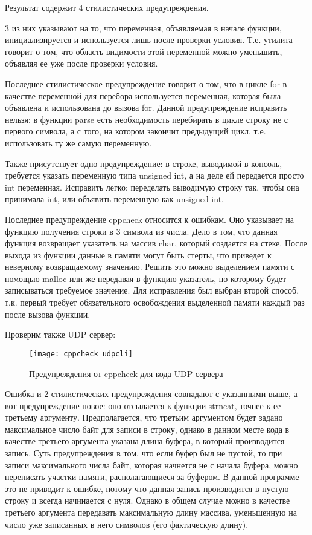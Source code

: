 Результат содержит 4 стилистических предупреждения.

3 из них указывают на то, что переменная, объявляемая в начале функции, инициализируется и используется лишь после проверки условия. Т.е. утилита говорит о том, что область видимости этой переменной можно уменьшить, объявляя ее уже после проверки условия.

Последнее стилистическое предупреждение говорит о том, что в цикле for в качестве переменной для перебора используется переменная, которая была объявлена и использована до вызова for. Данной предупреждение исправить нельзя: в функции parse есть необходимость перебирать в цикле строку не с первого символа, а с того, на котором закончит предыдущий цикл, т.е. использовать ту же самую переменную.

Также присутствует одно предупреждение: в строке, выводимой в консоль, требуется указать переменную типа unsigned int, а на деле ей передается просто int переменная. Исправить легко: переделать выводимую строку так, чтобы она принимала int, или объявить переменную как unsigned int.

Последнее предупреждение cppcheck относится к ошибкам. Оно указывает на функцию получения строки в 3 символа из числа. Дело в том, что данная функция возвращает указатель на массив char, который создается на стеке. После выхода из функции данные в памяти могут быть стерты, что приведет к неверному возвращаемому значению. Решить это можно выделением памяти с помощью malloc или же передавая в функцию указатель, по которому будет записываться требуемое значение. Для исправления был выбран второй способ, т.к. первый требует обязательного освобождения выделенной памяти каждый раз после вызова функции.

Проверим также UDP сервер:
\begin{figure}[H]
	\begin{center}
		\texttt{[image: cppcheck\_udpcli]}
		\caption{Предупреждения от cppcheck для кода UDP сервера} 
		\label{pic:cppcheck2} %
	\end{center}
\end{figure}

Ошибка и 2 стилистических предупреждения совпадают с указанными выше, а вот предупреждение новое: оно отсылается к функции strncat, точнее к ее третьему аргументу. Предполагается, что третьим аргументом будет задано максимальное число байт для записи в строку, однако в данном месте кода в качестве третьего аргумента указана длина буфера, в который производится запись. Суть предупреждения в том, что если буфер был не пустой, то при записи максимального числа байт, которая начнется не с начала буфера, можно переписать участки памяти, располагающиеся за буфером. В данной программе это не приводит к ошибке, потому что данная запись производится в пустую строку и всегда начинается с нуля. Однако в общем случае можно в качестве третьего аргумента передавать максимальную длину массива, уменьшенную на число уже записанных в него символов (его фактическую длину).

